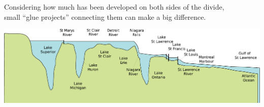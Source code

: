 \documentclass[aspectratio=169]{beamer}
\begin{document}
\begin{frame}{}
\vspace{1 cm}
\begin{center}
\large Considering how much has been developed on both sides of the divide, \\ small ``glue projects'' connecting them can make a big difference.
\end{center}

\vspace{1 cm}
\mbox{\hspace{-1.2 cm}}\includegraphics[width=1.16\linewidth]{great_lakes_levels.pdf}
\vspace{-1 cm}
\end{frame}
\end{document}
